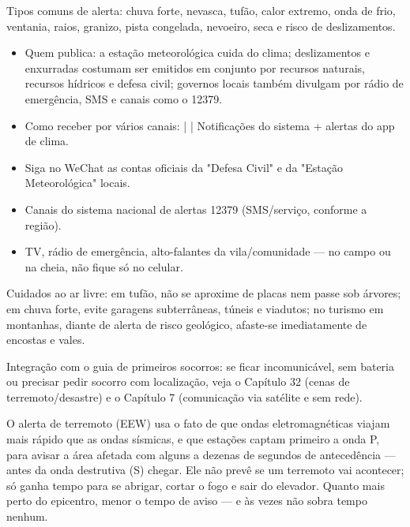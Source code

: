 Tipos comuns de alerta: chuva forte, nevasca, tufão, calor extremo, onda de frio, ventania, raios, granizo, pista congelada, nevoeiro, seca e risco de deslizamentos.


\begin{itemize}
  \item Quem publica: a estação meteorológica cuida do clima; deslizamentos e enxurradas costumam ser emitidos em conjunto por recursos naturais, recursos hídricos e defesa civil; governos locais também divulgam por rádio de emergência, SMS e canais como o 12379.
  \item Como receber por vários canais: | | Notificações do sistema + alertas do app de clima.
  \item Siga no WeChat as contas oficiais da "Defesa Civil" e da "Estação Meteorológica" locais.
  \item Canais do sistema nacional de alertas 12379 (SMS/serviço, conforme a região).
  \item TV, rádio de emergência, alto-falantes da vila/comunidade — no campo ou na cheia, não fique só no celular.
\end{itemize}

Cuidados ao ar livre: em tufão, não se aproxime de placas nem passe sob árvores; em chuva forte, evite garagens subterrâneas, túneis e viadutos; no turismo em montanhas, diante de alerta de risco geológico, afaste-se imediatamente de encostas e vales.

Integração com o guia de primeiros socorros: se ficar incomunicável, sem bateria ou precisar pedir socorro com localização, veja o Capítulo 32 (cenas de terremoto/desastre) e o Capítulo 7 (comunicação via satélite e sem rede).


O alerta de terremoto (EEW) usa o fato de que ondas eletromagnéticas viajam mais rápido que as ondas sísmicas, e que estações captam primeiro a onda P, para avisar a área afetada com alguns a dezenas de segundos de antecedência — antes da onda destrutiva (S) chegar. Ele não prevê se um terremoto vai acontecer; só ganha tempo para se abrigar, cortar o fogo e sair do elevador. Quanto mais perto do epicentro, menor o tempo de aviso — e às vezes não sobra tempo nenhum.

